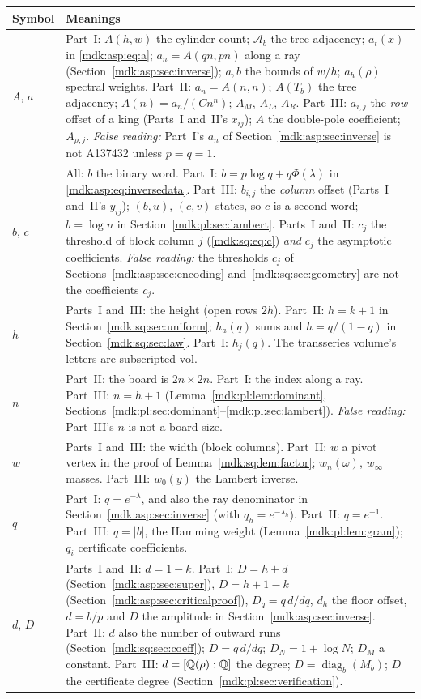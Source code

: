 \documentclass[11pt,letterpaper]{article}
\numberwithin{equation}{section}
\theoremstyle{remark}\newtheorem{remark}[theorem]{Remark}
\newcommand{\diag}{\operatorname{diag}}
\newcommand{\vol}{\mathrm{vol}}
\begin{document}
\begin{longtable}{@{}>{\raggedright\arraybackslash}p{} >{\raggedright\arraybackslash}p{}@{}}
\toprule
Symbol & Meanings\\
\midrule
\endhead
$A$, $a$ & Part~I: $A(h,w)$ the cylinder count; $\mathcal A_b$ the tree adjacency; $a_t(x)$ in \eqref{mdk:asp:eq:a}; $a_n=A(qn,pn)$ along a ray (Section~\ref{mdk:asp:sec:inverse}); $a,b$ the bounds of $w/h$; $a_h(\rho)$ spectral weights. Part~II: $a_n=A(n,n)$; $A(T_b)$ the tree adjacency; $A(n)=a_n/(Cn^n)$; $A_M$, $A_L$, $A_R$. Part~III: $a_{i,j}$ the \emph{row} offset of a king (Parts~I and~II's $x_{ij}$); $A$ the double-pole coefficient; $A_{\rho,j}$. \emph{False reading:} Part~I's $a_n$ of Section~\ref{mdk:asp:sec:inverse} is not A137432 unless $p=q=1$.\\
$b$, $c$ & All: $b$ the binary word. Part~I: $b=p\log q+q\Phi(\lambda)$ in \eqref{mdk:asp:eq:inversedata}. Part~III: $b_{i,j}$ the \emph{column} offset (Parts~I and~II's $y_{ij}$); $(b,u)$, $(c,v)$ states, so $c$ is a second word; $b=\log n$ in Section~\ref{mdk:pl:sec:lambert}. Parts~I and~II: $c_j$ the threshold of block column $j$ (\eqref{mdk:sq:eq:c}) \emph{and} $c_j$ the asymptotic coefficients. \emph{False reading:} the thresholds $c_j$ of Sections~\ref{mdk:asp:sec:encoding} and~\ref{mdk:sq:sec:geometry} are not the coefficients $c_j$.\\
$h$ & Parts~I and~III: the height (open rows $2h$). Part~II: $h=k+1$ in Section~\ref{mdk:sq:sec:uniform}; $h_a(q)$ sums and $h=q/(1-q)$ in Section~\ref{mdk:sq:sec:law}. Part~I: $h_j(q)$. The transseries volume's letters are subscripted $\vol$.\\
$n$ & Part~II: the board is $2n\times2n$. Part~I: the index along a ray. Part~III: $n=h+1$ (Lemma~\ref{mdk:pl:lem:dominant}, Sections~\ref{mdk:pl:sec:dominant}--\ref{mdk:pl:sec:lambert}). \emph{False reading:} Part~III's $n$ is not a board size.\\
$w$ & Parts~I and~III: the width (block columns). Part~II: $w$ a pivot vertex in the proof of Lemma~\ref{mdk:sq:lem:factor}; $w_n(\omega)$, $w_\infty$ masses. Part~III: $w_0(y)$ the Lambert inverse.\\
$q$ & Part~I: $q=e^{-\lambda}$, and also the ray denominator in Section~\ref{mdk:asp:sec:inverse} (with $q_h=e^{-\lambda_h}$). Part~II: $q=e^{-1}$. Part~III: $q=|b|$, the Hamming weight (Lemma~\ref{mdk:pl:lem:gram}); $q_i$ certificate coefficients.\\
$d$, $D$ & Parts~I and~II: $d=1-k$. Part~I: $D=h+d$ (Section~\ref{mdk:asp:sec:super}), $D=h+1-k$ (Section~\ref{mdk:asp:sec:criticalproof}), $D_q=q\,d/dq$, $d_h$ the floor offset, $d=b/p$ and $D$ the amplitude in Section~\ref{mdk:asp:sec:inverse}. Part~II: $d$ also the number of outward runs (Section~\ref{mdk:sq:sec:coeff}); $D=q\,d/dq$; $D_N=1+\log N$; $D_M$ a constant. Part~III: $d=[\mathbb Q(\rho):\mathbb Q]$ the degree; $D=\diag_b(M_b)$; $D$ the certificate degree (Section~\ref{mdk:pl:sec:verification}).\\

\end{longtable}
\end{document}
